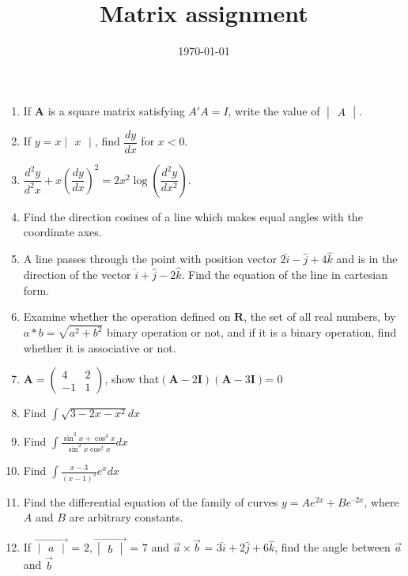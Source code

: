 \documentclass[12pt,-letter paper]{article}
\title{Matrix assignment}
\date{\today}
\providecommand{\brak}[1]{\ensuremath{\left(#1\right)}}
\theoremstyle{remark}
\newcommand{\myvec}[1]{\ensuremath{\begin{pmatrix}#1\end{pmatrix}}}
\newcommand{\mydet}[1]{\ensuremath{\begin{vmatrix}#1\end{vmatrix}}}
\let\vec\mathbf
\begin{document}
\begin{enumerate}
\item If $\vec{A}$ is a square matrix satisfying $A'A = I$, write the value of $\mydet{A}$.
   
\item If $y=x\mydet{x}$, find $\dfrac{dy}{dx}$ for $x < 0$.
        
 \item $\dfrac{d^2y}{d^2x}+x\brak{\dfrac{dy}{dx}}^2=2x^2\log\brak{\dfrac{d^2y}{dx^2}}$.
 
 \item Find the direction cosines of a line which makes equal angles with the coordinate axes.
 
 \item A line passes through the point with position vector $2\hat{i}-\hat{j}+4\hat{k}$ and is in the direction of the vector $\hat{i}+\hat{j}-2\hat{k}$. Find the equation of the line in cartesian form.
 
 \item Examine whether the operation defined on $\vec{R}$, the set of all real numbers, by $a * b = \sqrt{a^2+b^2}$ binary operation or not, and if it is a binary operation, find whether it is associative or not.
 
\item $\vec{A}= \myvec{4&2\\-1& 1}$, show that\brak{\vec{A}-2\vec{I}}\brak{\vec{A}-3\vec{I}}= $0$

\item Find $\int\sqrt{3-2x-x^2}dx$

\item Find $\int{\frac{\sin^3{x}+\cos^3{x}}{\sin^2{x}\cos^2{x}}}dx$

\item Find $\int{\frac{x-3}{\brak{x-1}^3}}e^x dx$

\item Find the differential equation of the family of curves ${y} = Ae^{2x} + Be^{–2x}$, where $A$ and $B$ are arbitrary constants.

\item If ${\overrightarrow{\mydet{a}}}$ = $2, {\overrightarrow{\mydet{b}}}$ = $7$ and $\overrightarrow{a}\times\overrightarrow{b}$ = $3\hat{i}+2\hat{j}+6\hat{k}$, find the angle between $\overrightarrow{a}$ and $\overrightarrow{b}$


\end{enumerate}
\end{document}
